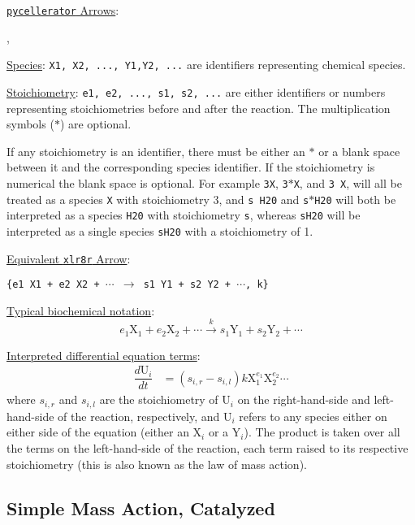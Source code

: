 \underline{{\tt pycellerator} Arrows}: \begin{center}
,

\end{center} 

\underline{Species}: {\tt X1, X2, ...,  Y1,Y2, ...} are identifiers representing chemical species.

\underline{Stoichiometry}: {\tt e1, e2, ..., s1, s2, ...} are either identifiers or numbers representing stoichiometries before and after the reaction. The multiplication symbols ($*$) are optional. 

If any stoichiometry is an identifier, there must be either an $*$ or a blank space between it and the corresponding species identifier. If the stoichiometry is numerical the blank space is optional. For example {\tt 3X}, {\tt 3$*$X}, and {\tt 3\ X}, will all be treated as a species {\tt X} with stoichiometry 3, and  {\tt s H20} and {\tt s$*$H20} will both be interpreted as a species {\tt H20} with stoichiometry {\tt s}, whereas {\tt sH20} will be interpreted as a single species {\tt sH20} with a stoichiometry of 1. 


\underline{Equivalent {\tt xlr8r} Arrow}: \begin{center}
{\tt \{e1 X1 + e2 X2 + $\cdots$  $\to$ s1 Y1 + s2 Y2 + $\cdots$, k\}}
\end{center}

\underline{Typical biochemical notation}: $$e_1 \text{X}_1 + e_2 \text{X}_2 + \cdots \overset{k}{\to} s_1\text{Y}_1 + s_2\text{Y}_2 + \cdots$$

\underline{Interpreted differential equation terms}: 
\begin{align*}
\dfrac{d\text{U}_i}{dt} &=
(s_{i,r}-s_{i,l}) k \text{X}_1^{e_1} \text{X}_2^{e_2} \cdots
\end{align*}
where $s_{i,r}$ and $s_{i,l}$ are the stoichiometry of $\text{U}_i$ on the right-hand-side and left-hand-side of the reaction, respectively, and $\text{U}_i$ refers to any species either on either side of the equation (either an $\text{X}_i$ or a $\text{Y}_i$). The product is taken over all the terms on the left-hand-side of the reaction, each term raised to its respective stoichiometry (this is also known as the law of mass action).  


\subsection{Simple Mass Action, Catalyzed}
\label{section:simple-mass-action-cat}

